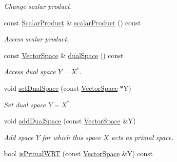 \begin{DoxyCompactItemize}
\begin{DoxyCompactList}\small\item\em Change scalar product. \end{DoxyCompactList}\item 
\hypertarget{classSpacy_1_1VectorSpace_a6f63e2ef5afe7530cbc9480cbc37a8d7}{}const \hyperlink{group__SpacyGroup_ga9fe0b4de20da1ab1ca3d04a0f96343e1_ga9fe0b4de20da1ab1ca3d04a0f96343e1}{Scalar\+Product} \& \hyperlink{classSpacy_1_1VectorSpace_a6f63e2ef5afe7530cbc9480cbc37a8d7}{scalar\+Product} () const \label{classSpacy_1_1VectorSpace_a6f63e2ef5afe7530cbc9480cbc37a8d7}

\begin{DoxyCompactList}\small\item\em Access scalar product. \end{DoxyCompactList}\item 
\hypertarget{classSpacy_1_1VectorSpace_ac90bd2dd9c6dbcd0a295b2b7d9e2b9b2}{}const \hyperlink{classSpacy_1_1VectorSpace}{Vector\+Space} \& \hyperlink{classSpacy_1_1VectorSpace_ac90bd2dd9c6dbcd0a295b2b7d9e2b9b2}{dual\+Space} () const \label{classSpacy_1_1VectorSpace_ac90bd2dd9c6dbcd0a295b2b7d9e2b9b2}

\begin{DoxyCompactList}\small\item\em Access dual space $Y=X^*$. \end{DoxyCompactList}\item 
\hypertarget{classSpacy_1_1VectorSpace_a22d977f8e7239de59f9c5abffdaa6b3d}{}void \hyperlink{classSpacy_1_1VectorSpace_a22d977f8e7239de59f9c5abffdaa6b3d}{set\+Dual\+Space} (const \hyperlink{classSpacy_1_1VectorSpace}{Vector\+Space} $\ast$Y)\label{classSpacy_1_1VectorSpace_a22d977f8e7239de59f9c5abffdaa6b3d}

\begin{DoxyCompactList}\small\item\em Set dual space $Y=X^*$. \end{DoxyCompactList}\item 
void \hyperlink{classSpacy_1_1VectorSpace_a6477c132f76235270db33fa85b13acd9_a6477c132f76235270db33fa85b13acd9}{add\+Dual\+Space} (const \hyperlink{classSpacy_1_1VectorSpace}{Vector\+Space} \&Y)
\begin{DoxyCompactList}\small\item\em Add space $Y$ for which this space $X$ acts as primal space. \end{DoxyCompactList}\item 
\hypertarget{classSpacy_1_1VectorSpace_aae96ebd6f5e4a1a95ab8684b49062e7d}{}bool \hyperlink{classSpacy_1_1VectorSpace_aae96ebd6f5e4a1a95ab8684b49062e7d}{is\+Primal\+W\+R\+T} (const \hyperlink{classSpacy_1_1VectorSpace}{Vector\+Space} \&Y) const \label{classSpacy_1_1VectorSpace_aae96ebd6f5e4a1a95ab8684b49062e7d}


\end{DoxyCompactItemize}
